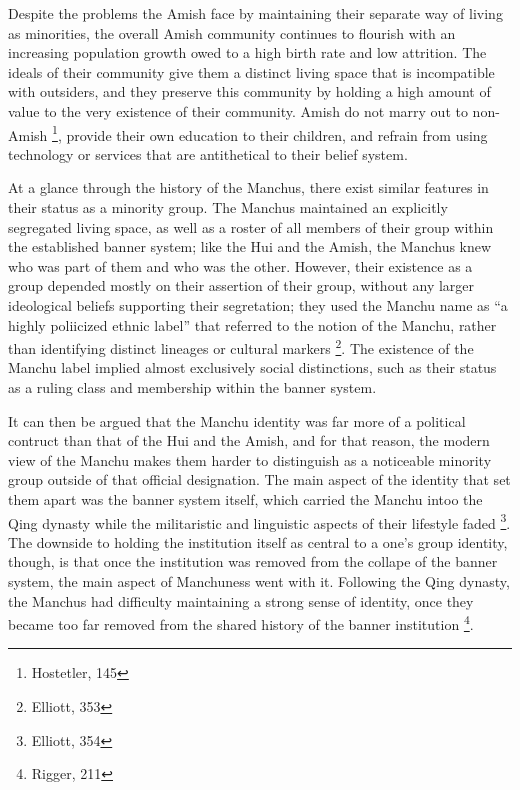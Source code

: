 Despite the problems the Amish face by maintaining their separate way
of living as minorities, the overall Amish community continues to flourish with
an increasing population growth owed to a high birth rate and low attrition.
The ideals of
their community give them a distinct living space that is incompatible with
outsiders, and they preserve this community by holding a high amount of value
to the very existence of their community. Amish do not marry out to non-Amish
\footnote{Hostetler, 145}, provide their own education to their children, and
refrain from using technology or services that are antithetical to their belief
system.

At a glance through the history of the Manchus, there exist similar features in
their status as a minority group. The Manchus maintained an explicitly
segregated living space, as well as a roster of all members of their group
within the established banner system; like the Hui and the Amish, the Manchus
knew who was part of them and who was the other. However, their existence as a
group depended mostly on their assertion of their group, without any larger
ideological beliefs supporting their segretation; they used the Manchu name as
``a highly poliicized ethnic label'' that referred to the notion of the Manchu,
rather than identifying distinct lineages or cultural markers \footnote{Elliott,
353}. The existence of the Manchu label implied almost exclusively social distinctions, such as their status as a ruling class and membership within the banner system.

It can then be argued that the Manchu identity was far more of a political
contruct than that of the Hui and the Amish, and for that reason, the modern
view of the Manchu makes them harder to distinguish as a noticeable minority
group outside of that official designation. The main aspect of the identity
that set them apart was the banner system itself, which carried the Manchu
intoo the Qing dynasty while the militaristic and linguistic aspects of their
lifestyle faded \footnote{Elliott, 354}. The downside to holding the
institution itself as central to a one's group identity, though, is that once
the institution was removed from the collape of the banner system, the main
aspect of Manchuness went with it. Following the Qing dynasty, the Manchus had
difficulty maintaining a strong sense of identity, once they became too far
removed from the shared history of the banner institution \footnote{Rigger,
211}.

